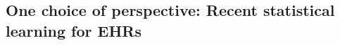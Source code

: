 \documentclass[french,12pt,twoside,a4paper]{book}
\begin{document}
\begin{background_box_left}



\end{background_box_left}


\subsection{One choice of perspective: Recent statistical learning for EHRs}%
\label{subsec:intro:focus_data}%
\end{document}
